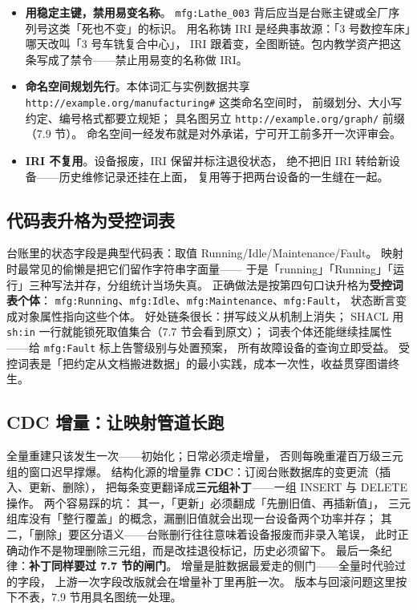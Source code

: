 \begin{itemize}
\item \textbf{用稳定主键，禁用易变名称}。
  \texttt{mfg:Lathe\_003} 背后应当是台账主键或全厂序列号这类「死也不变」的标识。
  用名称铸 IRI 是经典事故源：「3 号数控车床」哪天改叫「3 号车铣复合中心」，
  IRI 跟着变，全图断链。包内教学资产把这条写成了禁令——禁止用易变的名称做 IRI。
\item \textbf{命名空间规划先行}。本体词汇与实例数据共享\linebreak[4]
  \nolinkurl{http://example.org/manufacturing#} 这类命名空间时，
  前缀划分、大小写约定、编号格式都要立规矩；
  具名图另立 \texttt{http://example.org/graph/} 前缀（7.9 节）。
  命名空间一经发布就是对外承诺，宁可开工前多开一次评审会。
\item \textbf{IRI 不复用}。设备报废，IRI 保留并标注退役状态，
  绝不把旧 IRI 转给新设备——历史维修记录还挂在上面，
  复用等于把两台设备的一生缝在一起。
\end{itemize}

\subsection{代码表升格为受控词表}

台账里的状态字段是典型代码表：取值 Running/Idle/Maintenance/Fault。
映射时最常见的偷懒是把它们留作字符串字面量——
于是「running」「Running」「运行」三种写法并存，分组统计当场失真。
正确做法是按第四句口诀升格为\textbf{受控词表个体}：
\texttt{mfg:Running}、\texttt{mfg:Idle}、\texttt{mfg:Maintenance}、\texttt{mfg:Fault}，
状态断言变成对象属性指向这些个体。
好处链条很长：拼写歧义从机制上消失；
SHACL 用 \texttt{sh:in} 一行就能锁死取值集合（7.7 节会看到原文）；
词表个体还能继续挂属性——给 \texttt{mfg:Fault} 标上告警级别与处置预案，
所有故障设备的查询立即受益。
受控词表是「把约定从文档搬进数据」的最小实践，成本一次性，收益贯穿图谱终生。

\subsection{CDC 增量：让映射管道长跑}

全量重建只该发生一次——初始化；日常必须走增量，
否则每晚重灌百万级三元组的窗口迟早撑爆。
结构化源的增量靠 \textbf{CDC}：订阅台账数据库的变更流（插入、更新、删除），
把每条变更翻译成\textbf{三元组补丁}——一组 INSERT 与 DELETE 操作。
两个容易踩的坑：
其一，「更新」必须翻成「先删旧值、再插新值」，
三元组库没有「整行覆盖」的概念，漏删旧值就会出现一台设备两个功率并存；
其二，「删除」要区分语义——台账删行往往意味着设备报废而非录入笔误，
此时正确动作不是物理删除三元组，而是改挂退役标记，历史必须留下。
最后一条纪律：\textbf{补丁同样要过 7.7 节的闸门}。
增量是脏数据最爱走的侧门——全量时代验过的字段，
上游一次字段改版就会在增量补丁里再脏一次。
版本与回滚问题这里按下不表，7.9 节用具名图统一处理。

